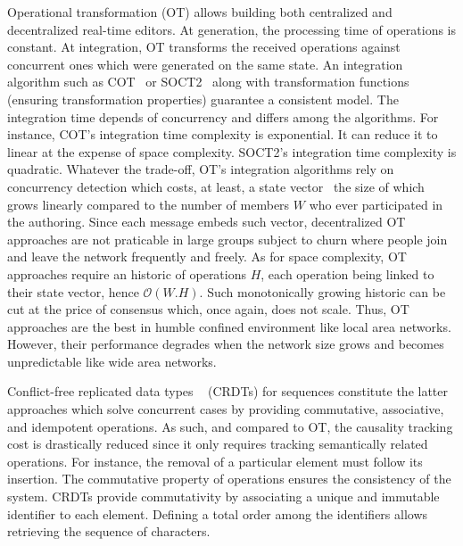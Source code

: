 \begin{asparadesc}
\item [Operational transformation] (OT) allows building both centralized and
  decentralized real-time editors. At generation, the processing time of
  operations is constant. At integration, OT transforms the received operations
  against concurrent ones which were generated on the same state. An integration
  algorithm such as COT~\cite{sun2009contextbased} or
  SOCT2~\cite{vidot2000copies} along with transformation functions (ensuring
  transformation properties) guarantee a consistent model. The integration time
  depends of concurrency and differs among the algorithms.  For instance, COT's
  integration time complexity is exponential. It can reduce it to linear at the
  expense of space complexity. SOCT2's integration time complexity is quadratic.
  Whatever the trade-off, OT's integration algorithms rely on concurrency
  detection which costs, at least, a state
  vector~\cite{charronbost1991concerning} the size of which grows linearly
  compared to the number of members $W$ who ever participated in the
  authoring. Since each message embeds such vector, decentralized OT approaches
  are not praticable in large groups subject to churn where people join and
  leave the network frequently and freely.  As for space complexity, OT
  approaches require an historic of operations $H$, each operation being linked
  to their state vector, hence $\mathcal{O}(W.H)$. Such monotonically growing
  historic can be cut at the price of consensus which, once again, does not
  scale. Thus, OT approaches are the best in humble confined environment like
  local area networks. However, their performance degrades when the network size
  grows and becomes unpredictable like wide area networks.

\item [Conflict-free replicated data types]~\cite{shapiro2011conflict,
    shapiro2011comprehensive} (CRDTs) for sequences constitute the latter
  approaches which solve concurrent cases by providing commutative, associative,
  and idempotent operations. As such, and compared to OT, the causality tracking
  cost is drastically reduced since it only requires tracking semantically
  related operations. For instance, the removal of a particular element must
  follow its insertion. The commutative property of operations ensures the
  consistency of the system. CRDTs provide commutativity by associating a unique
  and immutable identifier to each element. Defining a total order among the
  identifiers allows retrieving the sequence of characters.


\end{asparadesc}
